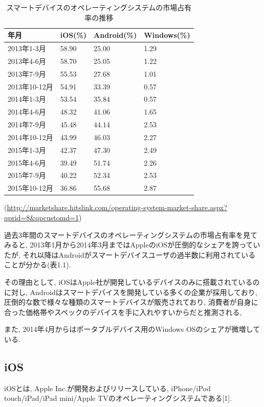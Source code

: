 \begin{table}[tb]
\begin{center}
\begin{tabular}{|l|p{2.5cm}|p{2.5cm}|p{2.5cm}|} \hline
年月 & iOS(\%) & Android(\%) & Windows(\%) \\ \hline \hline
2013年1-3月 & 58.90 & 25.00 & 1.29 \\ \hline
2013年4-6月 & 58.70 & 25.05 & 1.22 \\ \hline
2013年7-9月 & 55.53 & 27.68 & 1.01 \\ \hline
2013年10-12月 & 54.91 & 33.39 & 0.57 \\ \hline
2014年1-3月 & 53.54 & 35.84 & 0.57 \\ \hline
2014年4-6月 & 48.32 & 41.06 & 1.65 \\ \hline
2014年7-9月 & 45.48 & 44.14 & 2.53 \\ \hline
2014年10-12月 & 43.99 & 46.03 & 2.27 \\ \hline
2015年1-3月 & 42.37 & 47.30 & 2.49 \\ \hline
2015年4-6月 & 39.49 & 51.74 & 2.26 \\ \hline
2015年7-9月 & 40.22 & 52.34 & 2.53 \\ \hline
2015年10-12月 & 36.86 & 55.68 & 2.87 \\ \hline
\end{tabular}
\caption{スマートデバイスのオペレーティングシステムの市場占有率の推移}
\end{center}
\begin{flushright}
(\url{http://marketshare.hitslink.com/operating-system-market-share.aspx?qprid=8&qpcustomd=1})
\end{flushright}
\end{table}

過去3年間のスマートデバイスのオペレーティングシステムの市場占有率を見てみると, 2013年1月から2014年3月まではAppleのiOSが圧倒的なシェアを誇っていたが, それ以降はAndroidがスマートデバイスユーザの過半数に利用されていることが分かる(表1.1).

その理由として, iOSはApple社が開発しているデバイスのみに搭載されているのに対し, Androidはスマートデバイスを開発している多くの企業が採用しており, 圧倒的な数で様々な種類のスマートデバイスが販売されており, 消費者が自身に合った価格帯やスペックのデバイスを手に入れやすいからだと推測される,

また, 2014年4月からはポータブルデバイス用のWindows OSのシェアが微増している.

\subsection{iOS}
iOSとは, Apple Inc.が開発およびリリースしている, iPhone/iPod touch/iPad/iPad mini/Apple TVのオペレーティングシステムである[1].

